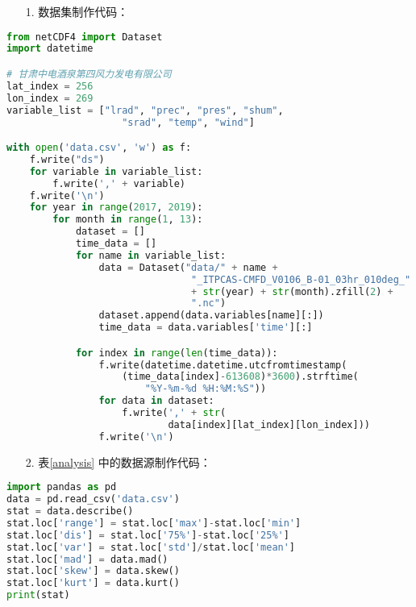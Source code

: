 \documentclass[AutoFakeBold]{LZUThesis}
\begin{document}
\backmatter


\printbib


\Appendix


\begin{itemize}
\item[1. ] 数据集制作代码：
\end{itemize}

\begin{lstlisting}[language = python]
from netCDF4 import Dataset
import datetime

# 甘肃中电酒泉第四风力发电有限公司
lat_index = 256
lon_index = 269
variable_list = ["lrad", "prec", "pres", "shum",
                    "srad", "temp", "wind"]

with open('data.csv', 'w') as f:
    f.write("ds")
    for variable in variable_list:
        f.write(',' + variable)
    f.write('\n')
    for year in range(2017, 2019):
        for month in range(1, 13):
            dataset = []
            time_data = []
            for name in variable_list:
                data = Dataset("data/" + name + 
                                "_ITPCAS-CMFD_V0106_B-01_03hr_010deg_"
                                + str(year) + str(month).zfill(2) +
                                ".nc")
                dataset.append(data.variables[name][:])
                time_data = data.variables['time'][:]

            for index in range(len(time_data)):
                f.write(datetime.datetime.utcfromtimestamp(
                    (time_data[index]-613608)*3600).strftime(
                        "%Y-%m-%d %H:%M:%S"))
                for data in dataset:
                    f.write(',' + str(
                            data[index][lat_index][lon_index]))
                f.write('\n')
\end{lstlisting}

\begin{itemize}
\item[2. ] 表\ref{analysis} 中的数据源制作代码：
\end{itemize}

\begin{lstlisting}[language = python]
import pandas as pd
data = pd.read_csv('data.csv')
stat = data.describe()
stat.loc['range'] = stat.loc['max']-stat.loc['min']
stat.loc['dis'] = stat.loc['75%']-stat.loc['25%']
stat.loc['var'] = stat.loc['std']/stat.loc['mean']
stat.loc['mad'] = data.mad()
stat.loc['skew'] = data.skew()
stat.loc['kurt'] = data.kurt()
print(stat)
\end{lstlisting}
\end{document}
